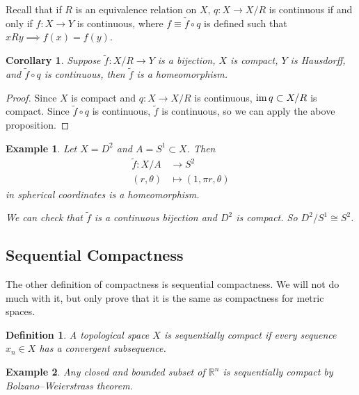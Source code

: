 \documentclass{article}
\theoremstyle{plain}\theoremheaderfont{\normalfont\itshape}\theorembodyfont{\rmfamily}\theoremseparator{.}\newtheorem*{rem}{Remark}\newtheorem*{ex}{Example}\newtheorem*{proof}{Proof}\newtheorem*{altp}{Alternative proof}
\theoremstyle{plain}\theoremheaderfont{\normalfont\bfseries}\theorembodyfont{\rmfamily}\theoremseparator{.}\newtheorem{thm}{Theorem}[section]\newtheorem{lem}[thm]{Lemma}\newtheorem{prop}[thm]{Proposition}\newtheorem*{cor}{Corollary}\newtheorem{defn}[thm]{Definition}\newtheorem{clm}[thm]{Claim}\newtheorem{clminproof}{Claim}
\theoremstyle{break}\theoremheaderfont{\normalfont\itshape}\theorembodyfont{\rmfamily}\theoremseparator{.\medskip}\newtheorem*{proofskip}{Proof}\newtheorem*{exs}{Examples}\newtheorem*{rems}{Remarks}
\theoremstyle{break}\theoremheaderfont{\normalfont\bfseries}\theorembodyfont{\rmfamily}\theoremseparator{.\medskip}\newtheorem{lemskip}[thm]{Lemma}\newtheorem{defnskip}[thm]{Definition}\newtheorem{propskip}[thm]{Proposition}\newtheorem{thmskip}[thm]{Theorem}
\DeclareMathOperator{\im}{im}
\begin{document}
    Recall that if \(R\) is an equivalence relation on \(X\), \(q:X\to X/R\) is continuous if and only if \(f:X\to Y\) is continuous, where \(f\equiv \tilde{f}\circ q\) is defined such that \(xRy\implies f(x)=f(y)\).

    \begin{cor}
        Suppose \(\tilde{f}:X/R\to Y\) is a bijection, \(X\) is compact, \(Y\) is Hausdorff, and \(\tilde{f}\circ q\) is continuous, then \(\tilde{f}\) is a homeomorphism.
    \end{cor}
    \begin{proof}
        Since \(X\) is compact and \(q:X\to X/R\) is continuous, \(\im q\subset X/R\) is compact. Since \(\tilde{f}\circ q\) is continuous, \(\tilde{f}\) is continuous, so we can apply the above proposition.
    \end{proof}
    \begin{ex}
        Let \(X=D^2\) and \(A=S^1\subset X\). Then
        \begin{align*}
            \tilde{f}:X/A&\to S^2\\
            (r,\theta)&\mapsto(1,\pi r,\theta)
        \end{align*}
        in spherical coordinates is a homeomorphism.

        We can check that \(\tilde{f}\) is a continuous bijection and \(D^2\) is compact. So \(D^2/S^1\cong S^2\).
    \end{ex}
    \subsection{Sequential Compactness}
    The other definition of compactness is sequential compactness. We will not do much with it, but only prove that it is the same as compactness for metric spaces.

    \begin{defn}
        A topological space \(X\) is \textit{sequentially compact} if every sequence \(x_n\in X\) has a convergent subsequence.
    \end{defn}
    \begin{ex}
        Any closed and bounded subset of \(\mathbb{R}^n\) is sequentially compact by Bolzano--Weierstrass theorem.
    \end{ex}
\end{document}
